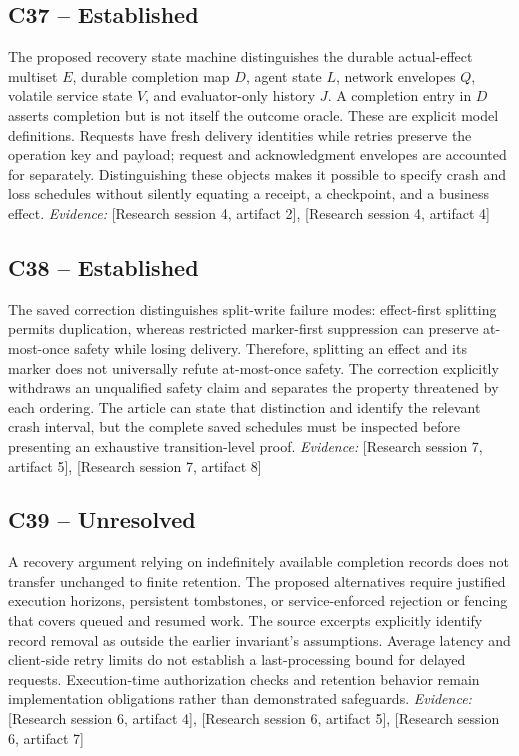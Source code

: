 \documentclass[11pt]{article}
\begin{document}
\subsection{C37 -- Established}
The proposed recovery state machine distinguishes the durable actual-effect multiset $E$, durable completion map $D$, agent state $L$, network envelopes $Q$, volatile service state $V$, and evaluator-only history $J$. A completion entry in $D$ asserts completion but is not itself the outcome oracle.
These are explicit model definitions. Requests have fresh delivery identities while retries preserve the operation key and payload; request and acknowledgment envelopes are accounted for separately. Distinguishing these objects makes it possible to specify crash and loss schedules without silently equating a receipt, a checkpoint, and a business effect.
\textit{Evidence: }[Research session 4, artifact 2], [Research session 4, artifact 4]
\subsection{C38 -- Established}
The saved correction distinguishes split-write failure modes: effect-first splitting permits duplication, whereas restricted marker-first suppression can preserve at-most-once safety while losing delivery. Therefore, splitting an effect and its marker does not universally refute at-most-once safety.
The correction explicitly withdraws an unqualified safety claim and separates the property threatened by each ordering. The article can state that distinction and identify the relevant crash interval, but the complete saved schedules must be inspected before presenting an exhaustive transition-level proof.
\textit{Evidence: }[Research session 7, artifact 5], [Research session 7, artifact 8]
\subsection{C39 -- Unresolved}
A recovery argument relying on indefinitely available completion records does not transfer unchanged to finite retention. The proposed alternatives require justified execution horizons, persistent tombstones, or service-enforced rejection or fencing that covers queued and resumed work.
The source excerpts explicitly identify record removal as outside the earlier invariant's assumptions. Average latency and client-side retry limits do not establish a last-processing bound for delayed requests. Execution-time authorization checks and retention behavior remain implementation obligations rather than demonstrated safeguards.
\textit{Evidence: }[Research session 6, artifact 4], [Research session 6, artifact 5], [Research session 6, artifact 7]
\end{document}
